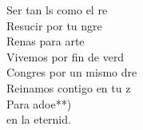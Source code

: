 \begin{cancion}
\begin{chorus}
	Ser tan ls como el re\\
	Resucir por tu ngre\\
	Renas para arte\\
	Vivemos por fin de verd\\
	Congres por un mismo dre\\
	Reinamos contigo en tu z\\
	Para adoe**)\\
	en la eternid.\\
	\end{chorus}%
	\jump\\
\end{cancion}%
